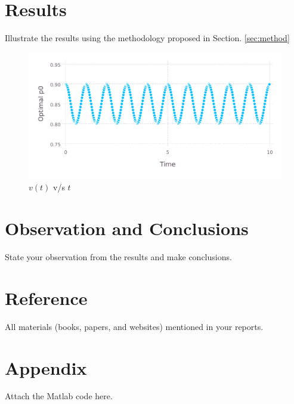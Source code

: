 \documentclass{ifacconf}
\begin{document}
\section{Results}
Illustrate the results using the methodology proposed in Section. \ref{sec:method}

\begin{figure}
	\label{fig:estv}
	\includegraphics[width=\linewidth]{estv.pdf}
	\caption{$v(t)$ v/s $t$}
\end{figure}



\section{Observation and Conclusions}
State your observation from the results and make conclusions. 

\section*{Reference}
All materials (books, papers, and websites) mentioned in your reports.   
\section*{Appendix}
Attach the Matlab code here.
\end{document}
